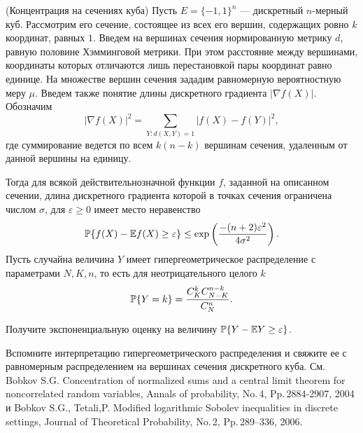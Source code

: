\begin{problem} (Концентрация на сечениях куба) Пусть $E = \{-1, 1\}^{n}$ --- дискретный $n$-мерный куб. Рассмотрим его сечение, состоящее из всех его вершин, содержащих ровно $k$ координат, равных $1$. Введем на вершинах сечения нормированную метрику $d$, равную половине Хэмминговой метрики. При этом расстояние между вершинами, координаты которых отличаются лишь перестановкой пары координат равно единице. На множестве вершин сечения зададим равномерную вероятностную меру $\mu$. Введем также понятие длины дискретного градиента $|\nabla f(X)|$. Обозначим
\[
|\nabla f(X)|^{2} = \sum\limits_{Y : d(X, Y) = 1}|f(X) - f(Y)|^{2},
\]
где суммирование ведется по всем $k(n - k)$ вершинам сечения, удаленным от данной вершины на единицу.

Тогда для всякой действительнозначной функции $f$, заданной на описанном сечении, длина дискретного градиента которой в точках сечения ограничена числом $\sigma$, для $\varepsilon \ge 0$ имеет место неравенство
\[
\mathrm{{\mathbb P}}\{f(X) - \mathrm{{\mathbb E}} f(X) \ge \varepsilon\} \le \exp\left(\frac{-(n + 2)\varepsilon^{2}}{4\sigma^{2}}\right).
\]
Пусть случайна величина $Y$ имеет гипергеометрическое распределение с параметрами $N, K, n$, то есть для неотрицательного целого $k$
\[
\mathrm{{\mathbb P}}\{Y = k\} = \frac{C_{K}^{k}C_{N - K}^{n - k}}{C_{N}^{n}}.
\]

Получите экспоненциальную оценку на величину $\mathrm{{\mathbb P}}\{Y - \mathrm{{\mathbb E}} Y \ge \varepsilon\}$.
\end{problem}

\begin{remark}
 Вспомните интерпретацию гипергеометрического распределения и свяжите ее с равномерным распределением на вершинах сечения дискретного куба.
См. Bobkov S.\;G. Concentration of normalized sums and a central limit theorem for noncorrelated random variables, Annals of probability, No.\,4, Pp.\,2884-2907, 2004 и Bobkov S.\;G., Tetali,\;P.
 Modified logarithmic Sobolev inequalities in discrete settings, 
Journal of Theoretical Probability,  No.\,2, Pp.\,289--336, 2006.
\end{remark}


